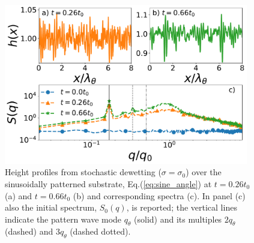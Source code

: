 \begin{figure}
    \centering
    \includegraphics[width=0.95\textwidth]{graphics/psd_spacedepCA_sine_25_10_1e-7_[0, 450000, 1150000]_9_3_rescaled.pdf}
    \caption{Height profiles from stochastic dewetting ($\sigma=\sigma_0$) over the sinusoidally patterned substrate, Eq.(\ref{eq:sine_angle}) at $t=0.26 t_0$ (a) and $t=0.66 t_0$ (b) and corresponding spectra (c).  
    In panel (c) also the initial spectrum, $S_0(q)$, is reported; the vertical lines indicate the pattern wave mode $q_{\theta}$ (solid) and its multiples $2q_{\theta}$ (dashed) and $3q_{\theta}$ (dashed dotted).}
    \label{fig:spectral_analysis_stoch_sine8}
\end{figure}

